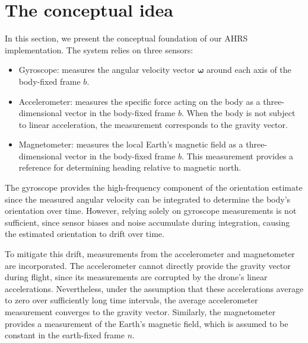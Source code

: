 \documentclass{article}
\begin{document}
	
\section{The conceptual idea}

	In this section, we present the conceptual foundation of our AHRS implementation. The system relies on three sensors:

	\begin{itemize}
		\item Gyroscope: measures the angular velocity vector $\boldsymbol{\omega}$ around each axis of the body-fixed frame $b$.
		
		\item Accelerometer: measures the specific force acting on the body as a three-dimensional vector in the body-fixed frame $b$. When the body is not subject to linear acceleration, the measurement corresponds to the gravity vector.
		
		\item Magnetometer: measures the local Earth's magnetic field as a three-dimensional vector in the body-fixed frame $b$. This measurement provides a reference for determining heading relative to magnetic north.

		
	\end{itemize}

	\noindent The gyroscope provides the high-frequency component of the orientation estimate since the measured angular velocity can be integrated to determine the body's orientation over time. However, relying solely on gyroscope measurements is not sufficient, since sensor biases and noise accumulate during integration, causing the estimated orientation to drift over time.
	
	\vspace{1em}
	
	\noindent To mitigate this drift, measurements from the accelerometer and magnetometer are incorporated. The accelerometer cannot directly provide the gravity vector during flight, since its measurements are corrupted by the drone's linear accelerations. Nevertheless, under the assumption that these accelerations average to zero over sufficiently long time intervals, the average accelerometer measurement converges to the gravity vector. Similarly, the magnetometer provides a measurement of the Earth's magnetic field, which is assumed to be constant in the earth-fixed frame $n$.
	
	\vspace{1em}
	
\end{document}
